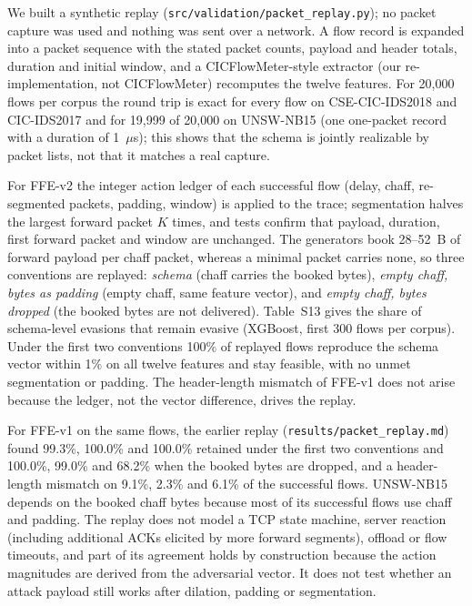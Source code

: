 We built a synthetic replay (\texttt{src/validation/packet\_replay.py}); no packet capture was used and nothing was sent over a network. A flow record is expanded into a packet sequence with the stated packet counts, payload and header totals, duration and initial window, and a CICFlowMeter-style extractor (our re-implementation, not CICFlowMeter) recomputes the twelve features. For 20,000 flows per corpus the round trip is exact for every flow on CSE-CIC-IDS2018 and CIC-IDS2017 and for 19,999 of 20,000 on UNSW-NB15 (one one-packet record with a duration of 1~$\mu$s); this shows that the schema is jointly realizable by packet lists, not that it matches a real capture.

For FFE-v2 the integer action ledger of each successful flow (delay, chaff, re-segmented packets, padding, window) is applied to the trace; segmentation halves the largest forward packet $K$ times, and tests confirm that payload, duration, first forward packet and window are unchanged. The generators book 28--52~B of forward payload per chaff packet, whereas a minimal packet carries none, so three conventions are replayed: \emph{schema} (chaff carries the booked bytes), \emph{empty chaff, bytes as padding} (empty chaff, same feature vector), and \emph{empty chaff, bytes dropped} (the booked bytes are not delivered). Table~S13 gives the share of schema-level evasions that remain evasive (XGBoost, first 300 flows per corpus). Under the first two conventions 100\% of replayed flows reproduce the schema vector within 1\% on all twelve features and stay feasible, with no unmet segmentation or padding. The header-length mismatch of FFE-v1 does not arise because the ledger, not the vector difference, drives the replay.

\begin{table}[!htbp]
\centering
\caption*{Table S13. Share (\%) of FFE-v2's schema-level evasions that remain evasive after packet-level replay (XGBoost).}
\footnotesize

\end{table}

For FFE-v1 on the same flows, the earlier replay (\texttt{results/packet\_replay.md}) found 99.3\%, 100.0\% and 100.0\% retained under the first two conventions and 100.0\%, 99.0\% and 68.2\% when the booked bytes are dropped, and a header-length mismatch on 9.1\%, 2.3\% and 6.1\% of the successful flows. UNSW-NB15 depends on the booked chaff bytes because most of its successful flows use chaff and padding. The replay does not model a TCP state machine, server reaction (including additional ACKs elicited by more forward segments), offload or flow timeouts, and part of its agreement holds by construction because the action magnitudes are derived from the adversarial vector. It does not test whether an attack payload still works after dilation, padding or segmentation.

